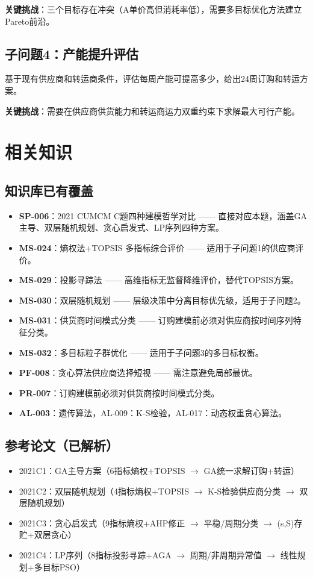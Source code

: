 \documentclass{internal-report}
\begin{document}
\textbf{关键挑战}：三个目标存在冲突（A单价高但消耗率低），需要多目标优化方法建立Pareto前沿。

\subsection{子问题4：产能提升评估}
基于现有供应商和转运商条件，评估每周产能可提高多少，给出24周订购和转运方案。

\textbf{关键挑战}：需要在供应商供货能力和转运商运力双重约束下求解最大可行产能。

\section{相关知识}

\subsection{知识库已有覆盖}

\begin{itemize}
  \item \textbf{SP-006}：2021 CUMCM C题四种建模哲学对比 —— 直接对应本题，涵盖GA主导、双层随机规划、贪心启发式、LP序列四种方案。
  \item \textbf{MS-024}：熵权法+TOPSIS 多指标综合评价 —— 适用于子问题1的供应商评价。
  \item \textbf{MS-029}：投影寻踪法 —— 高维指标无监督降维评价，替代TOPSIS方案。
  \item \textbf{MS-030}：双层随机规划 —— 层级决策中分离目标优先级，适用于子问题2。
  \item \textbf{MS-031}：供货商时间模式分类 —— 订购建模前必须对供应商按时间序列特征分类。
  \item \textbf{MS-032}：多目标粒子群优化 —— 适用于子问题3的多目标权衡。
  \item \textbf{PF-008}：贪心算法供应商选择短视 —— 需注意避免局部最优。
  \item \textbf{PR-007}：订购建模前必须对供货商按时间模式分类。
  \item \textbf{AL-003}：遗传算法，AL-009：K-S检验，AL-017：动态权重贪心算法。
\end{itemize}

\subsection{参考论文（已解析）}
\begin{itemize}
  \item 2021C1：GA主导方案（6指标熵权+TOPSIS $\to$ GA统一求解订购+转运）
  \item 2021C2：双层随机规划（4指标熵权+TOPSIS $\to$ K-S检验供应商分类 $\to$ 双层随机规划）
  \item 2021C3：贪心启发式（9指标熵权+AHP修正 $\to$ 平稳/周期分类 $\to$ (s,S)存贮+双层贪心）
  \item 2021C4：LP序列（8指标投影寻踪+AGA $\to$ 周期/非周期异常值 $\to$ 线性规划+多目标PSO）
\end{itemize}
\end{document}
